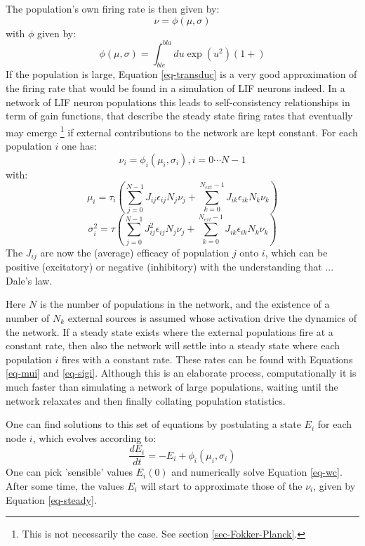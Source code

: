 \documentclass[12pt]{article}
\begin{document}
The population's own firing rate is then given by:
\begin{equation}
\nu = \phi( \mu, \sigma)
\label{eq-transduc}
\end{equation}
with $\phi$ given by:
\begin{equation}
\phi(\mu, \sigma) = \int^{bla}_{ble}du \exp(u^2)(1 + )
\end{equation}
If the population is large, Equation \ref{eq-transduc} is a very good approximation of the firing rate that would be found in a simulation
of LIF neurons indeed. In a network of LIF neuron populations this leads to self-consistency relationships in term of gain functions, that describe
the steady state firing rates that eventually may emerge \footnote{This is not necessarily the case. See section \ref{sec-Fokker-Planck}.} if external contributions to the network are kept constant. For each population $i$ one has:
\begin{equation}
  \nu_i = \phi_i( \mu_i, \sigma_i), i = 0 \cdots N-1
  \label{eq-steady}
\end{equation}
with:
\begin{equation}
  \mu_i = \tau_i (\sum^{N-1}_{j=0} J_{ij}\epsilon_{ij} N_j\nu_j + \sum^{N_{ext}-1}_{k=0} J_{ik} \epsilon_{ik}N_k \nu_k)
  \label{eq-mui}
\end{equation}
\begin{equation}
  \sigma^2_i = \tau (\sum^{N-1}_{j=0} J^2_{ij}\epsilon_{ij} N_j\nu_j + \sum^{N_{ext}-1}_{k=0} J_{ik} \epsilon_{ik}N_k \nu_k)
  \label{eq-sigi}
\end{equation}
The $J_{ij}$ are now the (average) efficacy of population $j$ onto $i$, which can be positive (excitatory) or negative (inhibitory)
with the understanding that  ... Dale's law.

Here $N$ is the number of populations in the network, and the existence of a number of $N_{k}$ external sources is assumed
whose activation drive the dynamics of the network. If a steady state exists where the external populations fire at a constant rate,
then also the network will settle into a steady state where each population $i$ fires with a constant rate. These rates can be found
with Equations \ref{eq-mui} and \ref{eq-sigi}. Although this is an elaborate process, computationally it is much faster than
simulating a network of large populations, waiting until the network relaxates and then finally collating population statistics.

One can find solutions to this set of equations by postulating a state $E_i$ for each node $i$, which evolves according to:
\begin{equation}
  \frac{dE_i}{dt} = -E_i + \phi_i (\mu_i, \sigma_i) 
  \label{eq-wc}
\end{equation}
One can pick 'sensible' values  $E_i(0)$ and numerically solve Equation \ref{eq-wc}. After some time, the values $E_i$ will start to approximate
those of the $\nu_i$, given by Equation \ref{eq-steady}. 
\end{document}
